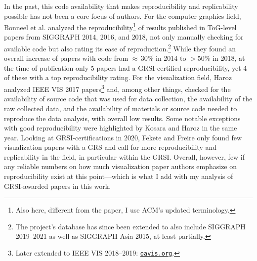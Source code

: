 \documentclass[conference]{vgtc}                     %
\begin{document}
In the past, this code availability that makes reproducibility and replicability possible has not been a core focus of authors. For the computer graphics field, Bonneel et al. \cite{Bonneel:2020:CRC} analyzed the reproducibility\footnote{Also here, different from the paper, I use ACM's updated terminology.} of results published in ToG-level papers from SIGGRAPH 2014, 2016, and 2018, not only manually checking for available code but also rating its ease of reproduction.\footnote{The project's database has since been extended to also include SIGGRAPH 2019--2021 as well as SIGGRAPH Asia 2015, at least partially.} While they found an overall increase of papers with code from $\approx$\,30\% in 2014 to $>$50\% in 2018, at the time of publication only 5 papers had a GRSI-certified reproducibility, yet 4 of these with a top reproducibility rating. For the visualization field, Haroz \cite{Haroz:2018:OPV} analyzed IEEE VIS 2017 papers\footnote{Later extended to IEEE VIS 2018--2019: \href{http://oavis.org/}{\texttt{oavis.org}}.} and, among other things, checked for the availability of source code that was used for data collection, the availability of the raw collected data, and the availability of materials or source code needed to reproduce the data analysis, with overall low results. Some notable exceptions with good reproducibility were highlighted by Kosara and Haroz \cite{Kosara:2018:SRC} in the same year. Looking at GRSI-certifications in 2020, Fekete and Freire \cite{Fekete:2020:ERV} only found few visualization papers with a GRS and call for more reproducibility and replicability in the field, in particular within the GRSI. Overall, however, few if any reliable numbers on how much visualization paper authors emphasize on reproducibility exist at this point---which is what I add with my analysis of GRSI-awarded papers in this work.
\end{document}
